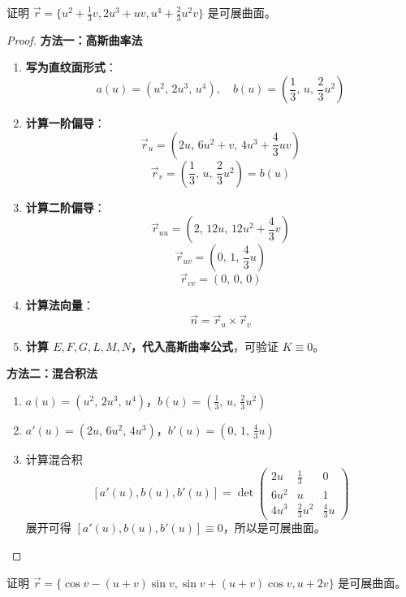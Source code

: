 \documentclass[lang=cn,10pt,thmcnt=section]{elegantbook}
\begin{document}
\begin{example}
	证明 $\vec{r} = \{u^2 + \frac{1}{3}v, 2u^3 + uv, u^4 + \frac{2}{3}u^2v\}$ 是可展曲面。
\end{example}
\begin{proof}

	\textbf{方法一：高斯曲率法}
	
	\begin{enumerate}
		\item \textbf{写为直纹面形式}：
		\[
		a(u) = \left(u^2,\, 2u^3,\, u^4\right),\quad b(u) = \left(\frac{1}{3},\, u,\, \frac{2}{3}u^2\right)
		\]
		\item \textbf{计算一阶偏导}：
		\[
		\vec{r}_u = (2u,\, 6u^2 + v,\, 4u^3 + \frac{4}{3}uv)
		\]
		\[
		\vec{r}_v = \left(\frac{1}{3},\, u,\, \frac{2}{3}u^2\right) = b(u)
		\]
		\item \textbf{计算二阶偏导}：
		\[
		\vec{r}_{uu} = (2,\, 12u,\, 12u^2 + \frac{4}{3}v)
		\]
		\[
		\vec{r}_{uv} = (0,\, 1,\, \frac{4}{3}u)
		\]
		\[
		\vec{r}_{vv} = (0,\, 0,\, 0)
		\]
		\item \textbf{计算法向量}：
		\[
		\vec{n} = \vec{r}_u \times \vec{r}_v
		\]
		\item \textbf{计算 $E, F, G, L, M, N$，代入高斯曲率公式}，可验证 $K \equiv 0$。
	\end{enumerate}
	
	\textbf{方法二：混合积法}
	
	\begin{enumerate}
		\item $a(u) = (u^2,\, 2u^3,\, u^4)$，$b(u) = \left(\frac{1}{3},\, u,\, \frac{2}{3}u^2\right)$
		\item $a'(u) = (2u,\, 6u^2,\, 4u^3)$，$b'(u) = (0,\, 1,\, \frac{4}{3}u)$
		\item 计算混合积
		\[
		[a'(u), b(u), b'(u)] = \det
		\begin{pmatrix}
		2u & \frac{1}{3} & 0 \\
		6u^2 & u & 1 \\
		4u^3 & \frac{2}{3}u^2 & \frac{4}{3}u
		\end{pmatrix}
		\]
		展开可得 $[a'(u), b(u), b'(u)] \equiv 0$，所以是可展曲面。
	\end{enumerate}
	\end{proof}
\begin{example}
	证明 $\vec{r} = \{\cos v - (u+v)\sin v, \sin v + (u+v)\cos v, u + 2v\}$ 是可展曲面。
\end{example}
\end{document}
